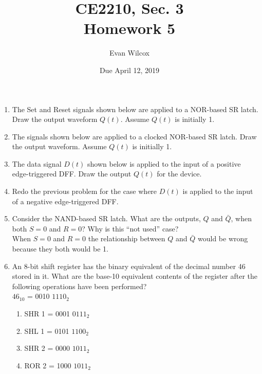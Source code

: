 \documentclass[a4paper]{article}
\title{CE2210, Sec. 3 \\Homework 5}
\author{Evan Wilcox}
\date{Due April 12, 2019}
\begin{document}
    \maketitle

    \begin{enumerate}
        
      \item  The Set and Reset signals shown below are applied to a NOR-based SR 
      latch. Draw the output waveform $Q(t)$. Assume $Q(t)$ is initially 1. \\
      \vspace{3.5cm}
    
      \item  The signals shown below are applied to a clocked NOR-based SR latch. 
      Draw the output waveform. Assume $Q(t)$ is initially 1. \\
      \vspace{3.5cm}
      
      \item The data signal $D(t)$ shown below is applied to the input of a positive 
      edge-triggered DFF. Draw the output $Q(t)$ for the device. \\

      \newpage
      \item Redo the previous problem for the case where $D(t)$ is applied to the input 
      of a negative edge-triggered DFF. \\
      \vspace{3.5cm}
    
      \item Consider the NAND-based SR latch. What are the outputs, $Q$ and $\bar{Q}$, 
      when both $S = 0$ and $R = 0$? Why is this “not used” case? \\

      When $S = 0$ and $R = 0$ the relationship between $Q$ and $\bar{Q}$ would be 
      wrong because they both would be 1. \\

    
      \item An 8-bit shift register has the binary equivalent of the decimal number 
      46 stored in it. What are the base-10 equivalent contents of the register 
      after the following operations have been performed? \\

      $46_{10}$ = 0010 $1110_{2}$

      \begin{enumerate}
        
        \item SHR 1 = 0001 $0111_{2}$
  
      
        \item SHL 1 = 0101 $1100_{2}$
  
      
        \item SHR 2 = 0000 $1011_{2}$
  
      
        \item ROR 2 = 1000 $1011_{2}$

  
      \end{enumerate}

    \end{enumerate}
\end{document}
